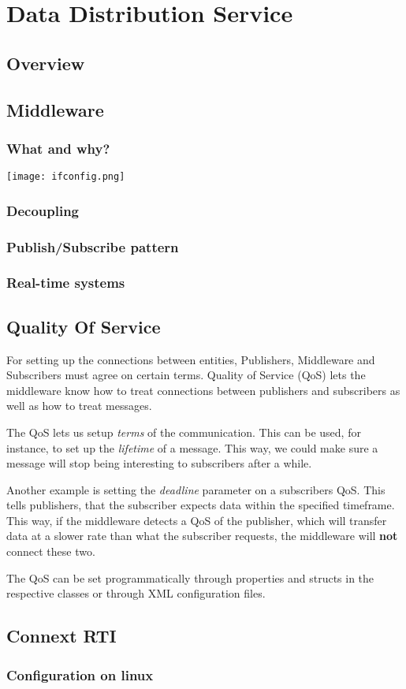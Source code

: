 \chapter{Data Distribution Service}
\section{Overview}


\section{Middleware}
\subsection{What and why?}


\begin{center}
	\texttt{[image: ifconfig.png]}
\end{center}

\subsection{Decoupling}



\subsection{Publish/Subscribe pattern}


\subsection{Real-time systems}

\section{Quality Of Service}
For setting up the connections between entities, Publishers, Middleware and Subscribers must agree on certain terms. Quality of Service (QoS) lets the middleware know how to treat connections between publishers and subscribers as well as how to treat messages.

The QoS lets us setup \textit{terms} of the communication. This can be used, for instance, to set up the \textit{lifetime} of a message. This way, we could make sure a message will stop being interesting to subscribers after a while. 

Another example is setting the \textit{deadline} parameter on a subscribers QoS. This tells publishers, that the subscriber expects data within the specified timeframe. This way, if the middleware detects a QoS of the publisher, which will transfer data at a slower rate than what the subscriber requests, the middleware will \textbf{not} connect these two.

The QoS can be set programmatically through properties and structs in the respective classes or through XML configuration files. 

\section{Connext RTI}

\subsection{Configuration on linux}